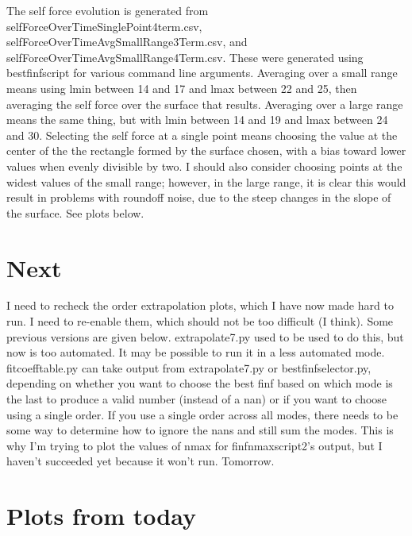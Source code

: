 \documentclass{article}
\begin{document}
The self force evolution is generated from selfForceOverTimeSinglePoint4term.csv, selfForceOverTimeAvgSmallRange3Term.csv, and selfForceOverTimeAvgSmallRange4Term.csv. These were generated using bestfinfscript for various command line arguments. Averaging over a small range means using lmin between 14 and 17 and lmax between 22 and 25, then averaging the self force over the surface that results. Averaging over a large range means the same thing, but with lmin between 14 and 19 and lmax between 24 and 30. Selecting the self force at a single point means choosing the value at the center of the the rectangle formed by the surface chosen, with a bias toward lower values when evenly divisible by two. I should also consider choosing points at the widest values of the small range; however, in the large range, it is clear this would result in problems with roundoff noise, due to the steep changes in the slope of the surface. See plots below. 


\section{Next}

I need to recheck the order extrapolation plots, which I have now made hard to run. I need to re-enable them, which should not be too difficult (I think). Some previous versions are given below. extrapolate7.py used to be used to do this, but now is too automated. It may be possible to run it in a less automated mode. fitcoefftable.py can take output from extrapolate7.py or bestfinfselector.py, depending on whether you want to choose the best finf based on which mode is the last to produce a valid number (instead of a nan) or if you want to choose using a single order. If you use a single order across all modes, there needs to be some way to determine how to ignore the nans and still sum the modes. This is why I'm trying to plot the values of nmax for finfnmaxscript2's output, but I haven't succeeded yet because it won't run. Tomorrow. 


\section{Plots from today}
\end{document}
